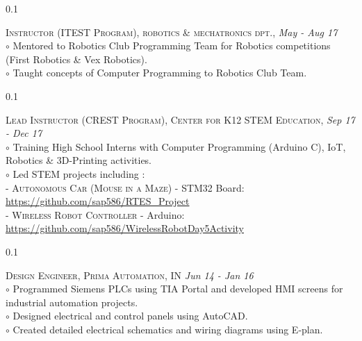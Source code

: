 \documentclass[a4paper]{article}
\begin{document}
%
\begin{spacing}{0.1}
\end{spacing}
\faBriefcase \textsc	{		Instructor (ITEST Program), robotics \& mechatronics dpt., \nyu												} \hfill \emph {May - Aug 17	}	\\
{\color{previousWork}
		{	$\circ$	{	Mentored to Robotics Club Programming Team for Robotics competitions (First Robotics \& Vex Robotics).									}	}	\\
		{	$\circ$	{	Taught concepts of Computer Programming to Robotics Club Team.																	}	}	\\
}
%
\begin{spacing}{0.1}
\end{spacing}
\faBriefcase \textsc	{		Lead Instructor (CREST Program), Center for K12 STEM Education, \nyu																			} \hfill \emph {Sep 17 - Dec 17	}	\\
{\color{previousWork}
		{	$\circ$	{	Training High School Interns with Computer Programming (Arduino C), IoT, Robotics \& 3D-Printing activities.											}	}	\\
		{	$\circ$	{	Led STEM projects including :																										}	}	\\
		{	-	{	\textsc{Autonomous Car (Mouse in a Maze)} - STM32 Board: \href{https://github.com/sap586/RTES_Project}{https://github.com/sap586/RTES\_Project}			}	}	\\
		{	-	{	\textsc{Wireless Robot Controller} - Arduino: \href{https://github.com/sap586/WirelessRobotDay5Activity}{https://github.com/sap586/WirelessRobotDay5Activity}	}	}	\\
}
		
		
		
%
\begin{spacing}{0.1}
\end{spacing}
\faBriefcase \textsc	{		Design Engineer, Prima Automation, IN																				} \hfill \emph {Jun 14 - Jan 16	}	\\
{\color{previousWork}
		{	$\circ$	{	Programmed Siemens PLCs using TIA Portal and developed HMI screens for industrial automation projects.								}	}	\\
		{	$\circ$	{	Designed electrical and control panels using AutoCAD.																		}	}	\\
		{	$\circ$	{	Created detailed electrical schematics and wiring diagrams using E‑plan.															}	}	\\
}
\end{document}
